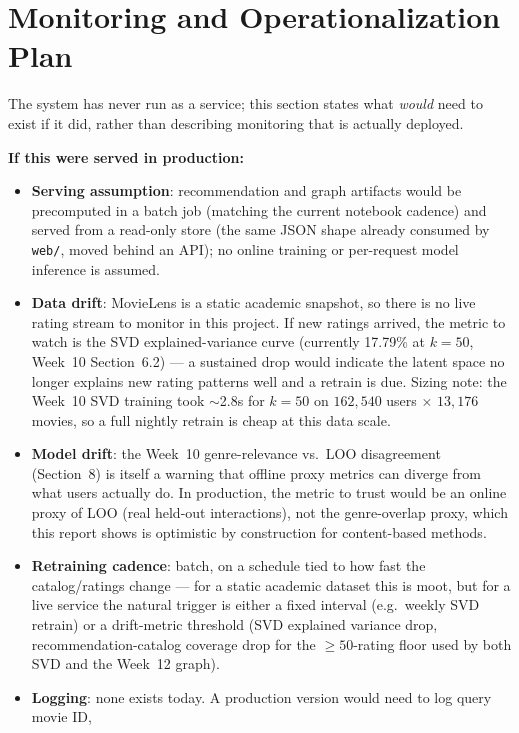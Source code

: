 \documentclass[12pt,a4paper]{article}
\begin{document}
\section{Monitoring and Operationalization Plan}

The system has never run as a service; this section states what \emph{would} need to exist if it
did, rather than describing monitoring that is actually deployed.

\textbf{If this were served in production:}

\begin{itemize}[nosep]
  \item \textbf{Serving assumption}: recommendation and graph artifacts would be precomputed in a
    batch job (matching the current notebook cadence) and served from a read-only store (the same
    JSON shape already consumed by \texttt{web/}, moved behind an API); no online training or
    per-request model inference is assumed.
  \item \textbf{Data drift}: MovieLens is a static academic snapshot, so there is no live rating
    stream to monitor in this project. If new ratings arrived, the metric to watch is the SVD
    explained-variance curve (currently 17.79\% at $k=50$, Week~10 Section~6.2) --- a sustained drop
    would indicate the latent space no longer explains new rating patterns well and a retrain is
    due. Sizing note: the Week~10 SVD training took $\sim$2.8s for $k=50$ on $162{,}540$ users
    $\times$ $13{,}176$ movies, so a full nightly retrain is cheap at this data scale.
  \item \textbf{Model drift}: the Week~10 genre-relevance vs.\ LOO disagreement (Section~8) is
    itself a warning that offline proxy metrics can diverge from what users actually do. In
    production, the metric to trust would be an online proxy of LOO (real held-out interactions),
    not the genre-overlap proxy, which this report shows is optimistic by construction for
    content-based methods.
  \item \textbf{Retraining cadence}: batch, on a schedule tied to how fast the catalog/ratings
    change --- for a static academic dataset this is moot, but for a live service the natural
    trigger is either a fixed interval (e.g.\ weekly SVD retrain) or a drift-metric threshold (SVD
    explained variance drop, recommendation-catalog coverage drop for the $\geq50$-rating floor
    used by both SVD and the Week~12 graph).
  \item \textbf{Logging}: none exists today. A production version would need to log query movie ID,

\end{itemize}
\end{document}
